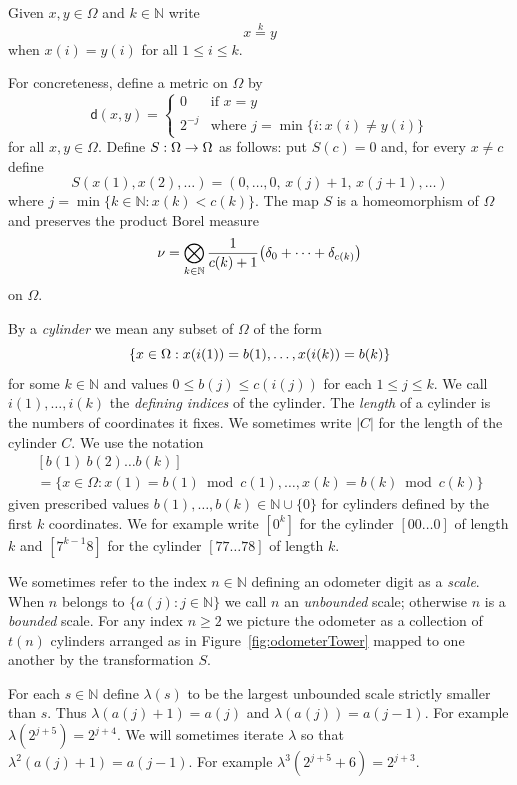 \documentclass[10pt]{amsart}
\theoremstyle{definition}\newtheorem{defi}[theo]{Definition}\newtheorem{rema}[theo]{Remark}\newtheorem{exam}[theo]{Example}\newtheorem{exem}[theo]{Example}\newtheorem{nota}[theo]{Notation}
\newcommand{\N}{\mathbb{N}}
\newcommand{\metric}{\mathsf{d}}
\let\originalleft\left
\let\originalright\right
\renewcommand{\left}{\mathopen{}\mathclose\bgroup\originalleft}
\renewcommand{\right}{\aftergroup\egroup\originalright}
\renewcommand*{\to}{\mathchoice{\longrightarrow}{\rightarrow}{\rightarrow}{\rightarrow}}
\begin{document}
Given $x,y \in \Omega$ and $k \in \N$ write
\[
x \overset{k}{=} y
\]
when $x(i) = y(i)$ for all $1 \le i \le k$.

For concreteness, define a metric on $\Omega$ by
\[
\metric(x,y) =
\begin{cases}
0  &\text{if } x=y \\
2^{-j} &\text{where } j = \min\{i:x(i)\neq y(i)\}
\end{cases}
\]
for all $x,y \in \Omega$. Define $S : \Omega \to \Omega$ as follows: put $S(c) = 0$ and, for every $x \ne c$ define
\[
S(x(1),x(2),\dots) = (0,\dots,0,\,x(j) + 1,\,x(j+1),\dots)
\]
where $j = \min \{ k \in \N : x(k) < c(k) \}$. The map $S$ is a homeomorphism of $\Omega$ and preserves the product Borel measure
\[
\nu = \bigotimes_{k \in \N} \frac{1}{c(k) + 1} \left(\delta_0 + \dots + \delta_{c(k)}\right)
\]
on $\Omega$.

By a
\emph{cylinder} we mean any subset of $\Omega$ of the form
\[
\left\{ x \in \Omega : x(i(1)) = b(1),\dots,x(i(k)) = b(k) \right\}
\]
for some $k \in \N$ and values $0 \le b(j) \le c(i(j))$ for each $1 \le j \le k$. We call $i(1),\dots,i(k)$ the
\emph{defining indices} of the cylinder. The
\emph{length} of a cylinder is the numbers of coordinates it fixes. We sometimes write $|C|$ for the length of the cylinder $C$. We use the notation
%
\begin{multline}\label{eqn:cylinder}
[b(1)\ b(2) \dots b(k)]\\
=
\{ x \in \Omega : x(1) = b(1) \bmod c(1),\dots,x(k) = b(k) \bmod c(k) \}
\end{multline}
given prescribed values $b(1), \dots, b(k) \in \N \cup \{0\}$ for cylinders defined by the first $k$ coordinates. We for example write $[0^k]$ for the cylinder $[00\dots 0]$ of length $k$ and $[7^{k-1} 8]$ for the cylinder $[77\dots 78]$ of length $k$.

We sometimes refer to the index $n \in \N$ defining an odometer digit as a
\emph{scale}. When $n$ belongs to $\{ a(j) : j \in \N \}$ we call $n$ an
\emph{unbounded} scale; otherwise $n$ is a
\emph{bounded} scale. For any index $n \ge 2$ we picture the odometer as a collection of $t(n)$ cylinders arranged as in Figure~\ref{fig:odometerTower} mapped to one another by the transformation $S$.

For each $s \in \N$ define $\lambda(s)$ to be the largest unbounded scale strictly smaller than $s$. Thus $\lambda(a(j)+1) = a(j)$ and $\lambda(a(j)) = a(j-1)$. For example $\lambda(2^{j+5}) = 2^{j+4}$. We will sometimes iterate $\lambda$ so that $\lambda^2(a(j)+1) = a(j-1)$. For example $\lambda^3(2^{j+5} + 6) = 2^{j+3}$.
\end{document}
